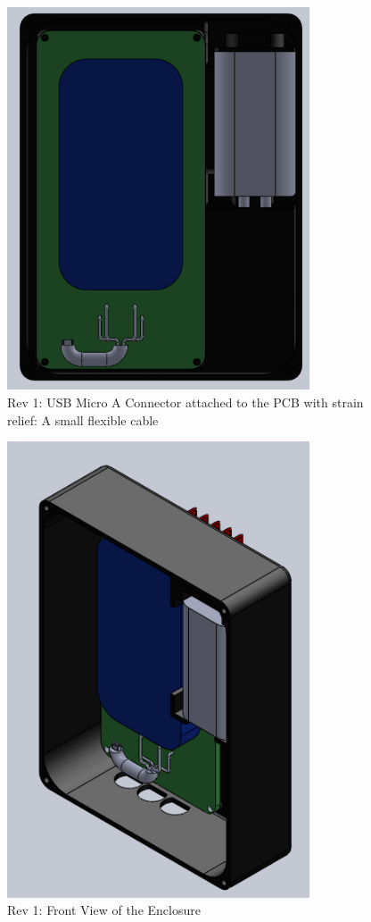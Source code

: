 \documentclass{article}
\numberwithin{figure}{section}
\numberwithin{equation}{section}
\begin{document}
{\begin{figure}[H]
	\centering
	\includegraphics[width=0.8\textwidth]{Assembly1}
	\caption{Rev 1: USB Micro A Connector attached to the PCB with strain relief: A small flexible cable}
	\label{fig:append_usbcable}
\end{figure}

\begin{figure}[H]
	\centering
	\includegraphics[width=0.8\textwidth]{Assembly2}
	\caption{Rev 1: Front View of the Enclosure}
	\label{fig:append_enclosurefront}
\end{figure}

}
\end{document}
